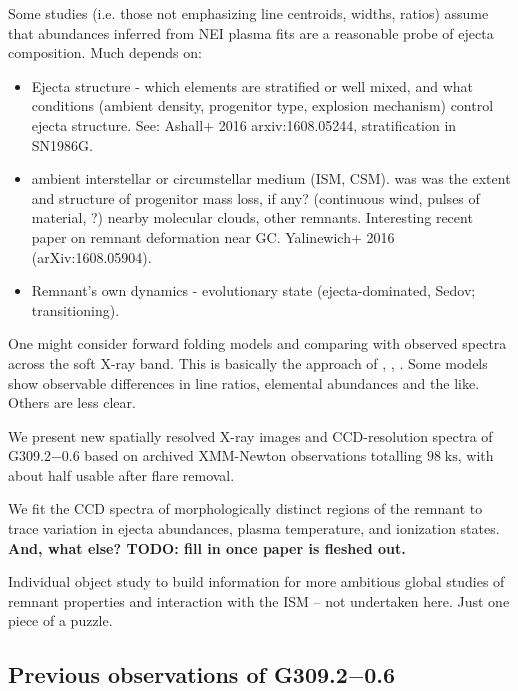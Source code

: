 \documentclass[twocolumn,tighten,trackchanges]{aastex61}
\newcommand*{\mt}{\mathrm}
\newcommand*{\unit}[1]{\;\mt{#1}}  %
\newcommand*{\Gsnr}{G309.2$-$0.6}
\begin{document}
Some studies (i.e. those not emphasizing line centroids, widths, ratios) assume
that abundances inferred from NEI plasma fits are a reasonable probe of ejecta
composition.  Much depends on:
\begin{itemize}
    \item Ejecta structure - which elements are stratified or well mixed, and
        what conditions (ambient density, progenitor type, explosion mechanism)
        control ejecta structure.
        See: Ashall+ 2016 arxiv:1608.05244, stratification in SN1986G.
    \item ambient interstellar or circumstellar medium (ISM, CSM).
        was was the extent and structure of progenitor mass loss, if any?
        (continuous wind, pulses of material, ?)
        nearby molecular clouds, other remnants.
        Interesting recent paper on remnant deformation near GC.
        Yalinewich+ 2016 (arXiv:1608.05904).
    \item Remnant's own dynamics - evolutionary state (ejecta-dominated, Sedov;
        transitioning).
\end{itemize}

One might consider forward folding models and comparing with observed spectra
across the soft X-ray band.
This is basically the approach of \citet{hughes1995}, \citet{badenes2003},
\citet{rakowski2006-g337}.
Some models show observable differences in line ratios, elemental abundances
and the like.  Others are less clear.

We present new spatially resolved X-ray images and CCD-resolution spectra of
\Gsnr{} based on archived XMM-Newton observations totalling $98 \unit{ks}$, with
about half usable after flare removal.

We fit the CCD spectra of morphologically distinct regions of the remnant to
trace variation in ejecta abundances, plasma temperature, and ionization
states.
\textbf{And, what else? TODO: fill in once paper is fleshed out.}

Individual object study to build information for more ambitious global studies
of remnant properties and interaction with the ISM -- not undertaken here.
Just one piece of a puzzle.

\subsection{Previous observations of \Gsnr{}}
\end{document}
